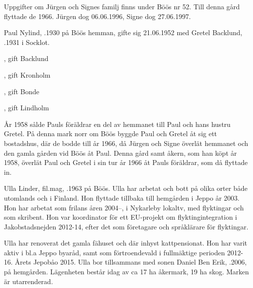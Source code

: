 Uppgifter om Jürgen och Signes familj finns under Böös nr 52. Till denna gård flyttade de 1966.
Jürgen dog 06.06.1996, Signe dog 27.06.1997.


%
Paul Nylind, .1930 på Böös hemman, gifte sig 21.06.1952 med Gretel Backlund, .1931 i Socklot.
\begin{jhchildren}
  \item {}, gift Backlund
  \item {}, gift Kronholm
  \item {}, gift Bonde
  \item {}, gift Lindholm
\end{jhchildren}

År 1958 sålde Pauls föräldrar en del av hemmanet till Paul och hans hustru Gretel. På denna mark norr om Böös byggde Paul och Gretel åt sig ett bostadshus, där de bodde till år 1966, då Jürgen och Signe överlät hemmanet och den gamla gården vid Böös åt Paul. Denna gård samt åkern, som han köpt år 1958, överlät Paul och Gretel i sin tur år 1966 åt Pauls föräldrar, som då flyttade in.



%



%
Ulla Linder, fil.mag,  .1963 på Böös. Ulla har arbetat och bott på olika orter både utomlands och i Finland. Hon flyttade tillbaka till hemgården i Jeppo år 2003. Hon har arbetat som frilans åren 2004--, i Nykarleby lokaltv, med flyktingar och som skribent. Hon var koordinator för ett EU-projekt om flyktingintegration i Jakobstadsnejden 2012-14, efter det som företagare och språklärare för flyktingar.

Ulla har renoverat det gamla fähuset och där inhyst kattpensionat. Hon har varit aktiv i bl.a Jeppo byaråd, samt som förtroendevald i fullmäktige perioden 2012-16. Årets Jepobåo 2015. Ulla bor tillsammans med sonen Daniel Ben Erik, .2006, på hemgården. Lägenheten består idag av ca 17 ha åkermark, 19 ha skog. Marken är utarrenderad.


